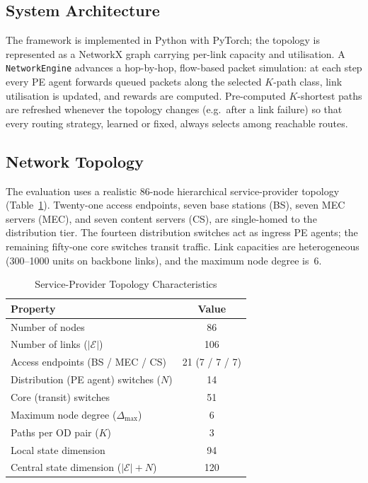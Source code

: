 \documentclass[10pt,journal,comsoc]{IEEEtran}
\begin{document}
\subsection{System Architecture}
The framework is implemented in Python with PyTorch; the topology is represented as a NetworkX graph carrying per-link capacity and utilisation. A \texttt{NetworkEngine} advances a hop-by-hop, flow-based packet simulation: at each step every PE agent forwards queued packets along the selected $K$-path class, link utilisation is updated, and rewards are computed. Pre-computed $K$-shortest paths are refreshed whenever the topology changes (e.g.\ after a link failure) so that every routing strategy, learned or fixed, always selects among reachable routes.

\subsection{Network Topology}
The evaluation uses a realistic 86-node hierarchical service-provider topology (Table~\ref{tab:topology}). Twenty-one access endpoints, seven base stations (BS), seven MEC servers (MEC), and seven content servers (CS), are single-homed to the distribution tier. The fourteen distribution switches act as ingress PE agents; the remaining fifty-one core switches transit traffic. Link capacities are heterogeneous (300--1000 units on backbone links), and the maximum node degree is~6.

\begin{table}[!t]
  \centering
  \caption{Service-Provider Topology Characteristics}
  \label{tab:topology}
  \begin{tabular}{lc}
    \toprule
    \textbf{Property} & \textbf{Value} \\
    \midrule
    Number of nodes & 86 \\
    Number of links ($|\mathcal{E}|$) & 106 \\
    Access endpoints (BS / MEC / CS) & 21 (7 / 7 / 7) \\
    Distribution (PE agent) switches ($N$) & 14 \\
    Core (transit) switches & 51 \\
    Maximum node degree ($\Delta_{\max}$) & 6 \\
    Paths per OD pair ($K$) & 3 \\
    \midrule
    Local state dimension & 94 \\
    Central state dimension ($|\mathcal{E}|+N$) & 120 \\
    \bottomrule
  \end{tabular}
\end{table}
\end{document}
